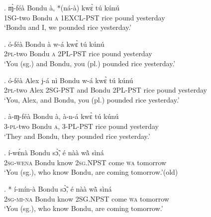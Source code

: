 \documentclass{assets/fieldnotes}
\begin{document}
\exg. ɱ̀-féà Bondu à, *(ná-à) kwɛ̀ tú kúnú\\
\textsc{1SG}-two {Bondu} \textsc{a} \textsc{1EXCL-PST} rice pound yesterday\\
`Bondu and I, we pounded rice yesterday.’\label{bondu_and_i}

\exg. ó-féà Bondu à w-á kwɛ̀ tú kúnú\\
\textsc{2pl}-two {Bondu} \textsc{a} \textsc{2PL-PST} rice pound yesterday\\
`You (sg.) and Bondu, you (pl.) pounded rice yesterday.’\label{you_and_bondu}


\exg. ó-féà Alex j-á nì Bondu w-á kwɛ̀ tú kúnú\\
\textsc{2pl}-two {Alex} \textsc{2SG-PST} and {Bondu} \textsc{2PL-PST} rice pound yesterday\\
`You, Alex, and Bondu, you (pl.) pounded rice yesterday.’\label{you_alex_bondu}


\exg. à-ɱ-féà Bondu à, à-n-á kwɛ̀ tú kúnú\\
\textsc{3-pl}-two {Bondu} \textsc{a}, \textsc{3-PL-PST} rice pound yesterday\\
`They and Bondu, they pounded rice yesterday.’\\


\exg. í-wɛ́nà Bondu sɔ̃̀, é nàà wã̀ sìná\\
\textsc{2sg}-\textsc{wena} Bondu know \textsc{2sg.NPST} come \textsc{wa} tomorrow\\
`You (sg.), who know Bondu, are coming tomorrow.’\hfill{(old)}

\exg. * í-mín-à Bondu sɔ̃̀, é nàà wã̀ sìná\\
\textsc{2sg}-\textsc{mi-na} Bondu know \textsc{2SG.NPST} come \textsc{wa} tomorrow\\
`You (sg.), who know Bondu, are coming tomorrow.’\\
\end{document}
